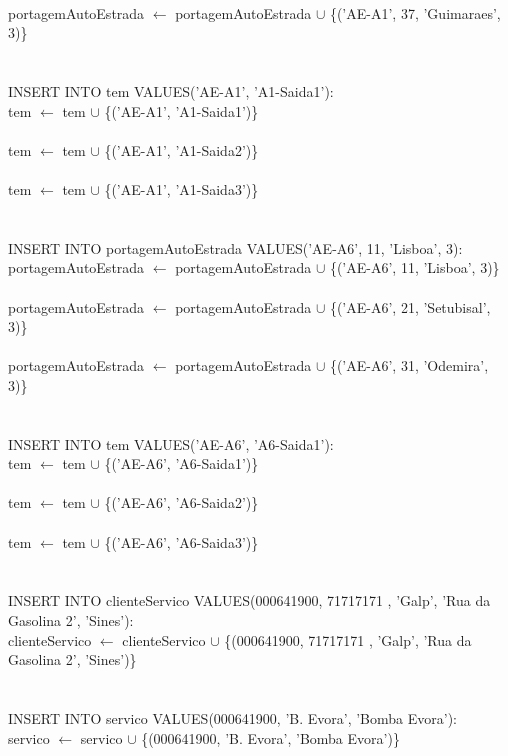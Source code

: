 \documentclass[a4paper]{article}
\begin{document}
\\
portagemAutoEstrada $\leftarrow$ portagemAutoEstrada $\cup$ \{('AE-A1', 37, 'Guimaraes', 3)\}\\
\\
\\
INSERT INTO tem VALUES('AE-A1', 'A1-Saida1'):\\
tem $\leftarrow$ tem $\cup$ \{('AE-A1', 'A1-Saida1')\}\\
\\
tem $\leftarrow$ tem $\cup$ \{('AE-A1', 'A1-Saida2')\}\\
\\
tem $\leftarrow$ tem $\cup$ \{('AE-A1', 'A1-Saida3')\}\\
\\
\\
\newpage
\noindent INSERT INTO portagemAutoEstrada VALUES('AE-A6', 11, 'Lisboa', 3):\\
portagemAutoEstrada $\leftarrow$ portagemAutoEstrada $\cup$ \{('AE-A6', 11, 'Lisboa', 3)\}\\
\\
portagemAutoEstrada $\leftarrow$ portagemAutoEstrada $\cup$ \{('AE-A6', 21, 'Setubisal', 3)\}\\
\\
portagemAutoEstrada $\leftarrow$ portagemAutoEstrada $\cup$ \{('AE-A6', 31, 'Odemira', 3)\}\\
\\
\\
INSERT INTO tem VALUES('AE-A6', 'A6-Saida1'):\\
tem $\leftarrow$ tem $\cup$ \{('AE-A6', 'A6-Saida1')\}\\
\\
tem $\leftarrow$ tem $\cup$ \{('AE-A6', 'A6-Saida2')\}\\
\\
tem $\leftarrow$ tem $\cup$ \{('AE-A6', 'A6-Saida3')\}\\
\\
\\
INSERT INTO clienteServico VALUES(000641900, 71717171 , 'Galp', 'Rua da Gasolina 2', 'Sines'):\\
clienteServico $\leftarrow$ clienteServico $\cup$ \{(000641900, 71717171 , 'Galp', 'Rua da Gasolina 2', 'Sines')\}\\
\\
\\
INSERT INTO servico VALUES(000641900, 'B. Evora', 'Bomba Evora'):\\
servico $\leftarrow$ servico $\cup$ \{(000641900, 'B. Evora', 'Bomba Evora')\}\\
\end{document}
